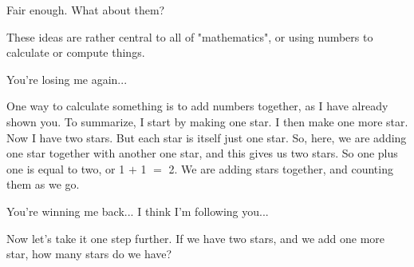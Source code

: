 \documentclass[main.tex]{subfiles}
\begin{document}
\par \Maia Fair enough.  What about them?

\par \Pleione These ideas are rather central to all of "mathematics", or using numbers to calculate or compute things.



\par \Maia You're losing me again...

\par \Pleione One way to calculate something is to add numbers together, as I have already shown you.  To summarize, I start by making one star.  I then make one more star.  Now I have two stars.  But each star is itself just one star.  So, here, we are adding one star together with another one star, and this gives us two stars.  So one plus one is equal to two, or 1 $+$ 1 $=$ 2.  We are adding stars together, and counting them as we go.

\par \Maia You're winning me back...  I think I'm following you...

\par \Pleione Now let's take it one step further.  If we have two stars, and we add one more star, how many stars do we have?

 
\end{document}
